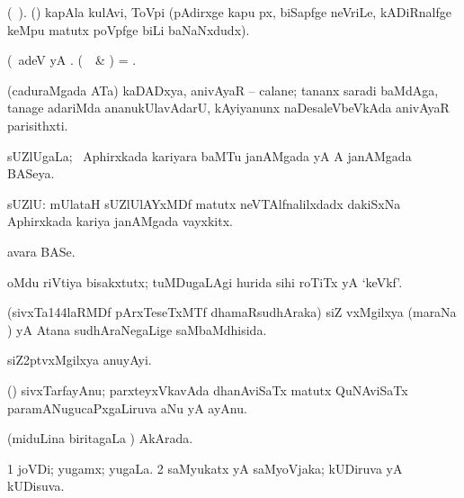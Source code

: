 \bentry
{} 
\gl{\nA} 
\bmng
(\bava\ ). 
(\roVkAyx)   kapAla kulAvi, ToVpi (pAdirxge kapu px, biSapfge neVriLe, kADiRnalfge keMpu matutx poVpfge biLi baNaNxdudx). \quad {}
\emng
\eentry

\bentry
{} 
\gl{\nA} 
\bmng
(\bava\ adeV yA . 
(\kanmu\  \ame\ \& \AseTxrXV)  = .
\emng
\eentry

\bentry
{} 
\gl{\nA} 
\bmng
(caduraMgada ATa) kaDADxya, anivAyaR -- calane; tananx saradi baMdAga,  tanage adariMda ananukUlavAdarU, kAyiyanunx naDesaleVbeVkAda anivAyaR parisithxti.
\emng
\eentry

\bentry
{} 
\gl{\gu} 
\bmng
sUZlUgaLa; \da\ Aphirxkada kariyara baMTu janAMgada yA A janAMgada BASeya.
\emng
\eentry

\bentry
{} 
\gl{\nA} 
\bmng
sUZlU: 
\banum
{} mUlataH sUZlUlAYxMDf matutx neVTAlfnalilxdadx dakiSxNa Aphirxkada kariya janAMgada vayxkitx. 

 avara BASe.
\eanum
\emng
\eentry

\bentry
{} 
\gl{\nA} 
\bmng
oMdu riVtiya bisakxtutx; tuMDugaLAgi hurida sihi roTiTx yA `keVkf'.
\emng
\eentry

\bentry
{} 
\gl{\gu} 
\bmng
(sivxTa\char144laRMDf pArxTeseTxMTf dhamaRsudhAraka) siZ\kern2pt vxMgilxya  (maraNa ) yA Atana sudhAraNegaLige saMbaMdhisida.
\emng 
\eentry

\bentry
{}  
\gl{\nA} 
\bmng
siZ\kern2ptvxMgilxya anuyAyi.
\emng
\eentry

\bentry
{} 
\gl{\nA} 
\bmng
(\ravi) sivxTarfayAnu; parxteyxVkavAda dhanAviSaTx matutx QuNAviSaTx paramANugucaPxgaLiruva aNu yA ayAnu. 
\emng
\eentry

\bentry
{} 
\gl{\gu} 
\bmng
(miduLina biritagaLa \vi)  AkArada.
\emng
\eentry

\bentry
{} 
\gl{\sapUpa} 
\bmng
\bnum
\num{1} joVDi; yugamx; yugaLa. 
\num{2} saMyukatx yA saMyoVjaka; kUDiruva yA kUDisuva.
\enum
\emng
\eentry

